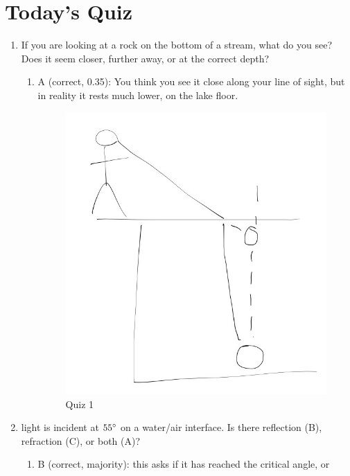 \documentclass[twocolumn,11pt]{article}
\begin{document}
	\section*{Today's Quiz}
	\begin{enumerate}
		\item If you are looking at a rock on the bottom of a stream, what do you see? Does it seem
			  closer, further away, or at the correct depth?
			  \begin{enumerate}
			  	\item A (correct, 0.35): You think you see it close along your line of sight,
					  but in reality it rests much lower, on the lake floor.
				\begin{figure}
					\begin{center}
						\caption{Quiz 1}
						\includegraphics[scale=0.4]{q1.png}
					\end{center}
				\end{figure}
			  \end{enumerate}
		\item light is incident at $55 \degree$ on a water/air interface. Is there reflection (B),
			  refraction (C), or both (A)?
			  \begin{enumerate}
			  	\item B (correct, majority): this asks if it has reached the critical angle, or

\end{enumerate}
\end{enumerate}
\end{document}
